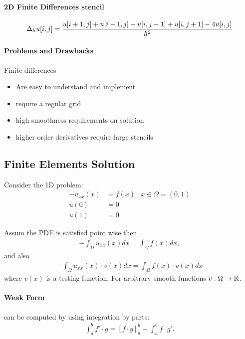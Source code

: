 \begin{multicols}{2}
\paragraph{2D Finite Differences stencil}
\begin{align*}
	\Delta_h u[i,j] = {u[i+1,j] + u[i-1,j] + u[i, j-1] + u[i,j+1] - 4u[i,j] \over h^2}
\end{align*}


\paragraph{Problems and Drawbacks} Finite differences
\begin{itemize}
	\item Are easy to understand and implement
	\item require a regular grid
	\item high smoothness requirements on solution
	\item higher order derivatives require large stencils
\end{itemize}


\subsection{Finite Elements Solution}
Consider the 1D problem:
\begin{align*}
-u_{xx}(x) &= f(x) & x\in \Omega=(0,1)\\
u(0) &= 0\\
u(1) &= 0
\end{align*}

Assum the PDE is satisfied point wise then
\begin{align*}
	-\int_\Omega u_{xx} (x) dx = \int_\Omega f(x) dx,
\end{align*}
and also
\begin{align*}
	-\int_\Omega u_{xx} (x)\cdot v(x) dx = \int_\Omega f(x)\cdot v(x) dx
\end{align*}
where $v(x)$ is a testing function. For arbitrary smooth functions $v: \Omega \rightarrow \mathbb{R}$.

\paragraph{Weak Form} can be computed by using integration by parts:
\begin{align*}
	\int_a^b f'\cdot g = [f\cdot g]_a^b - \int_a^b f\cdot g'.
\end{align*}


\end{multicols}
